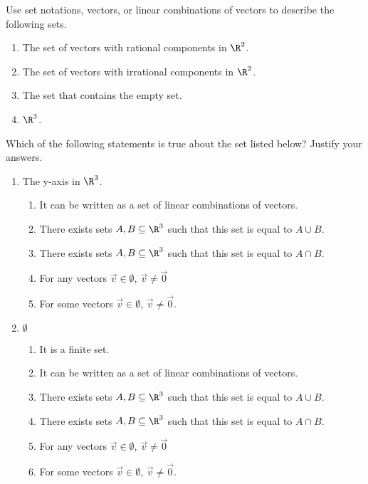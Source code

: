 \begin{exercises}
\begin{problist}
		\prob
		    Use set notations, vectors, or linear combinations of vectors to describe the following sets.
		    \begin{enumerate}
		        \item The set of vectors with rational components in $\R^2$.
		        \item The set of vectors with irrational components in $\R^2$.
		        \item The set that contains the empty set.
		        \item $\R^3$.
		    \end{enumerate}
    		
		\prob 
		Which of the following statements is true about the set listed below? Justify your answers.
		    \begin{enumerate}
		        \item The y-axis in $\R^3$.
		        \begin{enumerate}
		            \item It can be written as a set of linear combinations of vectors.
		            \item There exists sets $A , B \subseteq \R^3$ such that this set is equal to $A \cup B$.
		            \item There exists sets $A , B \subseteq \R^3$ such that this set is equal to $A \cap B$.
		            \item For any vectors $\vec v \in \emptyset$, $\vec v \neq \vec 0$
		            \item For some vectors $\vec v \in \emptyset$, $\vec v \neq \vec 0$.
		        \end{enumerate}
		        \item $\emptyset$
		        \begin{enumerate}
		            \item It is a finite set.
		            \item It can be written as a set of linear combinations of vectors.
		            \item There exists sets $A , B \subseteq \R^3$ such that this set is equal to $A \cup B$.
		            \item There exists sets $A , B \subseteq \R^3$ such that this set is equal to $A \cap B$.
		            \item For any vectors $\vec v \in \emptyset$, $\vec v \neq \vec 0$
		            \item For some vectors $\vec v \in \emptyset$, $\vec v \neq \vec 0$.
		        \end{enumerate}
		    \end{enumerate}
		    

\end{problist}
\end{exercises}
